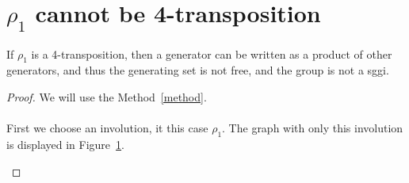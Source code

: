\section{$\rho_1$ cannot be 4-transposition}

\begin{theorem}
  \label{exclude-1}
  If $\rho_1$ is a 4-transposition, then a generator can be written as a product of other generators, and thus the generating set is not free, and the group is not a sggi.
\end{theorem}

\begin{proof}
We will use the Method~\ref{method}.

\paragraph{}
First we choose an involution, it this case $\rho_1$. The graph with only this involution is displayed in Figure~\ref{proof-5-1}.

\begin{figure}[H]
  \begin{center}
    \caption{}
    \label{proof-5-1}
  \end{center}
\end{figure}


\end{proof}
